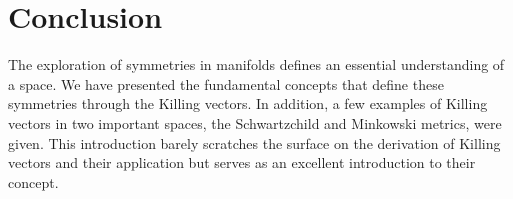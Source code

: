 \documentclass[11pt]{article}
\begin{document}
%


\section{Conclusion}
The exploration of symmetries in manifolds defines an essential understanding of a space. We have presented the fundamental concepts that define these symmetries through the Killing vectors. In addition, a few examples of Killing vectors in two important spaces, the Schwartzchild and Minkowski metrics, were given. This introduction barely scratches the surface on the derivation of Killing vectors and their application but serves as an excellent introduction to their concept.


\vskip 0.2in

\end{document}
